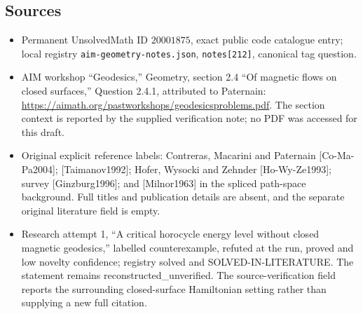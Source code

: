 \documentclass[11pt]{article}
\begin{document}
\subsection{Sources}
\begin{itemize}
\item Permanent UnsolvedMath ID \(20001875\), exact public code catalogue entry; local registry \texttt{aim-geometry-notes.json}, \texttt{notes[212]}, canonical tag question.
\item AIM workshop ``Geodesics,'' Geometry, section 2.4 ``Of magnetic flows on closed surfaces,'' Question 2.4.1, attributed to Paternain: \url{https://aimath.org/pastworkshops/geodesicsproblems.pdf}. The section context is reported by the supplied verification note; no PDF was accessed for this draft.
\item Original explicit reference labels: Contreras, Macarini and Paternain [Co-Ma-Pa2004]; [Taimanov1992]; Hofer, Wysocki and Zehnder [Ho-Wy-Ze1993]; survey [Ginzburg1996]; and [Milnor1963] in the spliced path-space background. Full titles and publication details are absent, and the separate original literature field is empty.
\item Research attempt 1, ``A critical horocycle energy level without closed magnetic geodesics,'' labelled counterexample, refuted at the run, proved and low novelty confidence; registry solved and SOLVED-IN-LITERATURE. The statement remains reconstructed\_unverified. The source-verification field reports the surrounding closed-surface Hamiltonian setting rather than supplying a new full citation.
\end{itemize}
\end{document}
